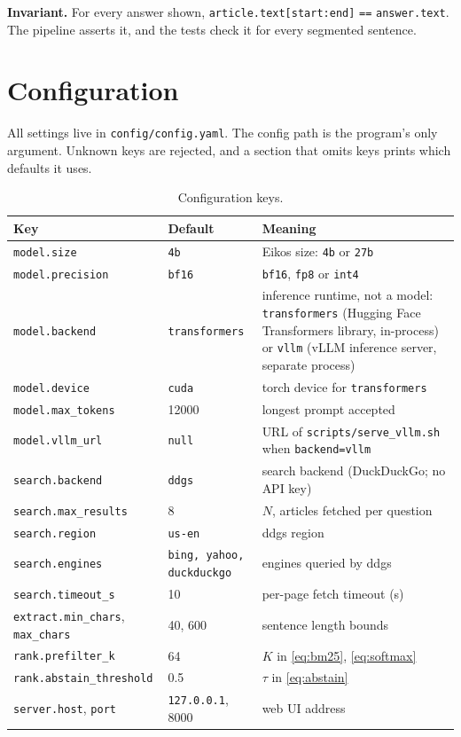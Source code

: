 \documentclass[11pt,a4paper]{article}
\newcommand{\code}[1]{\texttt{#1}}
\begin{document}
\noindent\textbf{Invariant.} For every answer shown,
\code{article.text[start:end]} \code{==} \code{answer.text}. The pipeline asserts it, and the tests check it for every segmented
sentence.

\section{Configuration}

All settings live in \code{config/config.yaml}. The config path is the program's only argument. Unknown keys are
rejected, and a section that omits keys prints which defaults it uses.

\begin{table}[htbp]
\centering
\caption{Configuration keys.}
\label{tab:config}
\begin{tabularx}{\linewidth}{llY}
\toprule
Key & Default & Meaning \\
\midrule
\code{model.size}        & \code{4b}  & Eikos size: \code{4b} or \code{27b} \\
\code{model.precision}   & \code{bf16} & \code{bf16}, \code{fp8} or \code{int4} \\
\code{model.backend}     & \code{transformers} & inference runtime, not a model: \code{transformers} (Hugging Face Transformers library, in-process) or \code{vllm} (vLLM inference server, separate process) \\
\code{model.device}      & \code{cuda} & torch device for \code{transformers} \\
\code{model.max\_tokens} & 12000 & longest prompt accepted \\
\code{model.vllm\_url}   & \code{null} & URL of \code{scripts/serve\_vllm.sh} when \code{backend=vllm} \\
\code{search.backend}    & \code{ddgs} & search backend (DuckDuckGo; no API key) \\
\code{search.max\_results} & 8 & $N$, articles fetched per question \\
\code{search.region}     & \code{us-en} & ddgs region \\
\code{search.engines}    & \code{bing, yahoo, duckduckgo} & engines queried by ddgs \\
\code{search.timeout\_s} & 10 & per-page fetch timeout (s) \\
\code{extract.min\_chars}, \code{max\_chars} & 40, 600 & sentence length bounds \\
\code{rank.prefilter\_k} & 64 & $K$ in \eqref{eq:bm25}, \eqref{eq:softmax} \\
\code{rank.abstain\_threshold} & 0.5 & $\tau$ in \eqref{eq:abstain} \\
\code{server.host}, \code{port} & \code{127.0.0.1}, 8000 & web UI address \\
\bottomrule
\end{tabularx}
\end{table}
\end{document}
